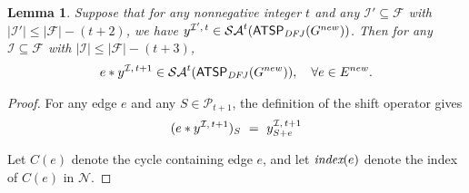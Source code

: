 \documentclass[11pt]{article}
\newtheorem{lemma}[theorem]{Lemma}
\newcommand{\pop}{\mathcal{P}}
\newcommand{\atspdfj}{\homog{\textsf{ATSP$_{\mathit{DFJ}}$}}}
\newcommand{\cindset}{\mathcal{N}}
\newcommand{\fracset}{\mathcal{F}}
\newcommand{\sgn}{\mathcal{I}}
\newcommand{\saop}{\mathcal{SA}}
\newcommand{\homog}[1]{{#1}}
\begin{document}
\begin{lemma}
\label{lemma:dfj-cond1}
Suppose that for any nonnegative integer $t$ and
any $\sgn'\subseteq \fracset$ with $|\sgn'|\leq |\fracset| - (t+2)$,
we have $\zvec{\sgn'}{t} \in \saop^t(\atspdfj(G^{new}))$. Then for any $\sgn\subseteq \fracset$ with $|\sgn|\leq |\fracset| - (t+3)$,
\begin{align}
e*\zvec{\sgn}{t+1} \in \saop^t(\atspdfj(G^{new})), \quad \forall e\in E^{new}. \nonumber
\end{align}
\end{lemma}

\begin{proof}
For any edge $e$ and any $S \in \pop_{t+1}$,
the definition of the shift operator gives
\[ (e * \zvec{\sgn}{t+1})_S ~=~ \zvec{\sgn}{t+1}_{S+e}
\]

Let $C(e)$ denote the cycle containing edge $e$,
and let $\textit{index}(e)$ denote the index of $C(e)$ in $\cindset$.


\end{proof}
\end{document}
